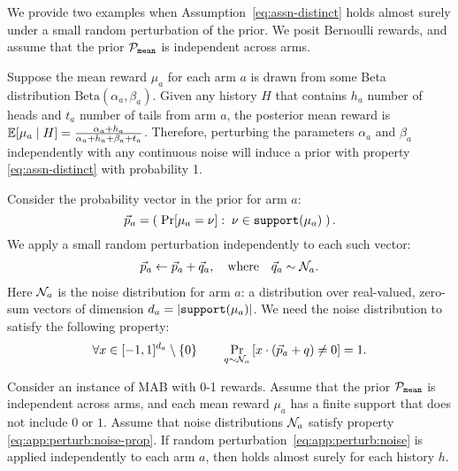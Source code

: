 We provide two examples when Assumption~\eqref{eq:assn-distinct} holds almost surely under a small random perturbation of the prior. We posit Bernoulli rewards, and assume that the prior $\mathcal{P}_\mathtt{mean}$ is independent across arms.



 Suppose the mean reward $\mu_a$ for each arm $a$ is drawn from some Beta distribution $\text{Beta}(\alpha_a, \beta_a)$. Given any history $H$ that contains $h_a$ number of heads and $t_a$ number of tails from arm $a$, the posterior mean reward is
    $\E[\mu_a \mid H] =  \frac{\alpha_a + h_a}{\alpha_a + h_a + \beta_a + t_a}$.
Therefore, perturbing the
    parameters $\alpha_a$ and $\beta_a$ independently with any
    continuous noise will induce a prior with property
    \eqref{eq:assn-distinct} with probability 1.

 Consider the probability vector in the prior for arm $a$:
\[ \vec{p}_a = \left(\; \Pr[\mu_a=\nu]:\; \nu\in \mathtt{support}(\mu_a)\; \right).\]
We apply a small random perturbation independently to each such vector:
\begin{align}\label{eq:app:perturb:noise}
\vec{p}_a \leftarrow \vec{p}_a + \vec{q}_a,
    \quad \text{where}\quad \vec{q}_a\sim  \mathcal{N}_a.
\end{align}
Here $\mathcal{N}_a$ is the noise distribution for arm $a$: a distribution over real-valued, zero-sum vectors of dimension $d_a = |\mathtt{support}(\mu_a)|$. We need the noise distribution to satisfy the following property:
\begin{align}\label{eq:app:perturb:noise-prop}
\forall x\in [-1,1]^{d_a}\setminus \{0\}\qquad
\Pr_{q\sim \mathcal{N}_a}\left[ x\cdot(\vec{p}_a+ q) \neq 0 \right] =1.
\end{align}

\begin{theorem}\label{thm:perturb}
Consider an instance of MAB with 0-1 rewards. Assume that the prior $\mathcal{P}_\mathtt{mean}$ is independent across arms, and each mean reward $\mu_a$ has a finite support that does not include $0$ or $1$. Assume that noise distributions $\mathcal{N}_a$ satisfy property \eqref{eq:app:perturb:noise-prop}. If random perturbation~\eqref{eq:app:perturb:noise} is applied independently to each arm $a$, then  holds almost surely for each history $h$.
\end{theorem}

